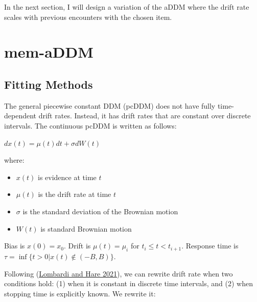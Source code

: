 \documentclass[
]{book}
\providecommand{\tightlist}{%
  \setlength{\itemsep}{0pt}\setlength{\parskip}{0pt}}
\begin{document}
In the next section, I will design a variation of the aDDM where the drift rate scales with previous encounters with the chosen item.

\hypertarget{mem-addm}{%
\section{mem-aDDM}\label{mem-addm}}

\hypertarget{fitting-methods}{%
\subsection{Fitting Methods}\label{fitting-methods}}

The general piecewise constant DDM (pcDDM) does not have fully time-dependent drift rates. Instead, it has drift rates that are constant over discrete intervals. The continuous pcDDM is written as follows:

\(dx(t) = \mu(t) dt + \sigma dW(t)\)

where:

\begin{itemize}
\tightlist
\item
  \(x(t)\) is evidence at time \(t\)
\item
  \(\mu(t)\) is the drift rate at time \(t\)
\item
  \(\sigma\) is the standard deviation of the Brownian motion
\item
  \(W(t)\) is standard Brownian motion
\end{itemize}

Bias is \(x(0)=x_0\). Drift is \(\mu(t)=\mu_i\) for \(t_i \leq t < t_{i+1}\). Response time is \(\tau = \inf\{t>0|x(t)\not\in(-B,B)\}\).

Following (\protect\hyperlink{ref-lombardi2021}{Lombardi and Hare 2021}), we can rewrite drift rate when two conditions hold: (1) when it is constant in discrete time intervals, and (2) when stopping time is explicitly known. We rewrite it:
\end{document}
